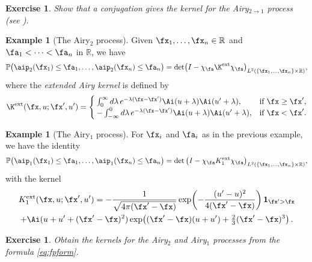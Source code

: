 \documentclass[]{pcmi}
\theoremstyle{plain}
\newtheorem{exercise}[equation]{Exercise}
\theoremstyle{definition}
\newtheorem{example}[equation]{Example}
\newcommand{\uno}[1]{\mathbf{1}_{#1}}
\begin{document}
\begin{exercise}  
Show that a conjugation gives the kernel for the Airy$_{2\to1}$ process (see \cite{bfs}).
\end{exercise}

\begin{example}[The Airy$_2$ process]  
Given $\fx_1,\dots,\fx_n\in\mathbb{R}$ and $\fa_1<\dots<\fa_n$ in $\mathbb{R}$, we have
\begin{equation}
  \mathbb{P}\bigl(\aip_2(\fx_1)\le \fa_1,\dots,\aip_2(\fx_n)\le \fa_n\bigr) =
  \det \bigl(I-\chi_{\fa}\K^{\mathrm{ext}} \chi_{\fa}\bigr)_{L^2(\{\fx_1,\dots,\fx_n\}\times\mathbb{R})},
\end{equation}
where the {\it extended Airy kernel} is defined by
\begin{equation}
  \K^\mathrm{ext}(\fx,u;\fx',u')=
  \begin{cases}
    \int_0^\infty d\lambda\,e^{-\lambda(\fx-\fx')}\Ai(u+\lambda)\Ai(u'+\lambda), &\text{if $\fx\ge \fx'$},\\
    -\int_{-\infty}^0 d\lambda\,e^{-\lambda(\fx-\fx')}\Ai(u+\lambda)\Ai(u'+\lambda), &\text{if $\fx<\fx'$}.
  \end{cases}\label{eq:extAiry}
\end{equation}
\end{example}

\begin{example}[The Airy$_1$ process] 
For $\fx_i$ and $\fa_i$ as in the previous example, we have the identity
\begin{equation}
  \mathbb{P}\bigl(\aip_1(\fx_1)\le \fa_1,\dots,\aip_1(\fx_n)\le \fa_n\bigr) = 
  \det\big(I-\chi_{\fa}K^{\mathrm{ext}}_1 \chi_{\fa}\big)_{L^2(\{\fx_1,\dots,\fx_n\}\times\mathbb{R})},
\end{equation}
with the kernel
\begin{multline}\label{eq:fExtAiry1}
  K^{\rm ext}_1(\fx,u;\fx',u')=-\frac{1}{\sqrt{4\pi
      (\fx'-\fx)}}\exp\!\left(-\frac{(u'-u)^2}{4 (\fx'-\fx)}\right)\uno{\fx'>\fx}\\
  +\Ai(u+u'+(\fx'-\fx)^2) \exp\!\left((\fx'-\fx)(u+u')+\tfrac23(\fx'-\fx)^3\right).
\end{multline}
\end{example}

\begin{exercise}\label{eq:getAiry}
 Obtain the kernels for the Airy$_2$ and Airy$_1$ processes from the formula \eqref{eq:fpform}.
\end{exercise}
\end{document}
